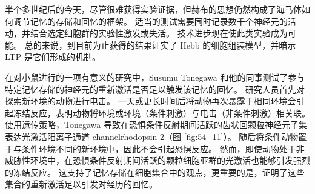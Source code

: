 半个多世纪后的今天，尽管很难获得实验证据，但赫布的思想仍然构成了海马体如何调节记忆的存储和回忆的框架。
适当的测试需要同时记录数千个神经元的活动，并结合选定细胞群的实验性激发或失活。
技术进步现在使此类实验成为可能。
总的来说，到目前为止获得的结果证实了 Hebb 的细胞组装模型，并暗示 LTP 是它们形成的机制。


在对小鼠进行的一项有意义的研究中，Susumu Tonegawa 和他的同事测试了参与特定记忆存储的神经元的重新激活是否足以触发该记忆的回忆。
研究人员首先对探索新环境的动物进行电击。
一天或更长时间后将动物再次暴露于相同环境会引起冻结反应，表明动物将环境或环境（条件刺激）与电击（非条件刺激）相关联。
使用遗传策略，Tonegawa 导致在恐惧条件反射期间活跃的齿状回颗粒神经元子集表达光激活阳离子通道 channelrhodopsin-2（图 \ref{fig:54_11}）。
随后将条件动物置于与条件环境不同的新环境中，因此不会引起恐惧反应。
然而，即使动物处于非威胁性环境中，在恐惧条件反射期间活跃的颗粒细胞亚群的光激活也能够引发强烈的冻结反应。
这支持了记忆存储在细胞集合中的观点，更重要的是，证明了这些集合的重新激活足以引发对经历的回忆。


